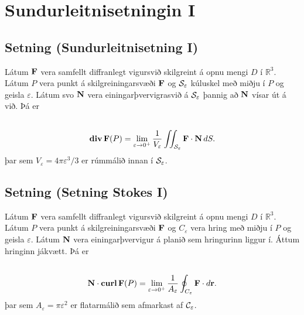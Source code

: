 \documentclass[a4paper,10pt,icelandic]{sphinxmanual}
\begin{document}

\section{Sundurleitnisetningin I}
\label{Kafli6:sundurleitnisetningin-i}\label{Kafli6:index-2}

\subsection{Setning (Sundurleitnisetning I)}
\label{Kafli6:setning-sundurleitnisetning-i}
Látum \(\mbox{${\bf F}$}\) vera samfellt diffranlegt vigursvið
skilgreint á opnu mengi \(D\) í \({\mathbb  R}^3\). Látum
\(P\) vera punkt á skilgreiningarsvæði \(\mbox{${\bf F}$}\) og
\({\cal S}_\varepsilon\) kúluskel með miðju í \(P\) og geisla
\(\varepsilon\). Látum svo \(\mbox{${\bf N}$}\) vera
einingarþvervigrasvið á \({\cal S}_\varepsilon\) þannig að
\(\mbox{${\bf N}$}\) vísar út á við. Þá er
\begin{gather}
\begin{split}\displaystyle\end{split}\notag\\\begin{split}\mbox{${\rm\bf div\,}$}\mbox{${\bf F}$}(P)=\lim_{\varepsilon\rightarrow 0^+}
\frac{1}{V_\varepsilon}\int\!\!\!\int_{{\cal S}_\varepsilon}\mbox{${\bf F}$}\cdot\mbox{${\bf N}$}\,dS.\end{split}\notag
\end{gather}
þar sem \(V_\varepsilon= 4\pi\varepsilon^3/3\) er rúmmálið innan í
\({\cal S}_\varepsilon\).


\subsection{Setning (Setning Stokes I)}
\label{Kafli6:setning-setning-stokes-i}\label{Kafli6:index-3}
Látum \(\mbox{${\bf F}$}\) vera samfellt diffranlegt vigursvið
skilgreint á opnu mengi \(D\) í \({\mathbb  R}^3\). Látum
\(P\) vera punkt á skilgreiningarsvæði \(\mbox{${\bf F}$}\) og
\(C_\varepsilon\) vera hring með miðju í \(P\) og geisla
\(\varepsilon\). Látum \(\mbox{${\bf N}$}\) vera
einingarþvervigur á planið sem hringurinn liggur í. Áttum hringinn
jákvætt. Þá er
\begin{gather}
\begin{split}\displaystyle\end{split}\notag\\\begin{split}\mbox{${\bf N}$}\cdot\mbox{${\rm\bf curl\,}$}\mbox{${\bf F}$}(P)=\lim_{\varepsilon\rightarrow 0^+}
\frac{1}{A_\varepsilon}\oint_{C_\varepsilon}\mbox{${\bf F}$}\cdot d\mbox{${\bf r}$}.\end{split}\notag
\end{gather}
þar sem \(A_\varepsilon= \pi\varepsilon^2\) er flatarmálið sem
afmarkast af \({\cal C}_\varepsilon\).
\end{document}
